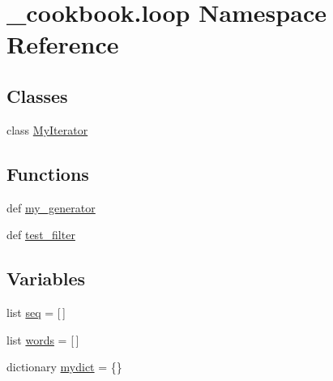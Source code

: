 \hypertarget{namespace__cookbook_1_1loop}{\section{\-\_\-cookbook.\-loop Namespace Reference}
\label{namespace__cookbook_1_1loop}
}
\subsection*{Classes}
\begin{DoxyCompactItemize}
\item 
class \hyperlink{class__cookbook_1_1loop_1_1MyIterator}{My\-Iterator}
\end{DoxyCompactItemize}
\subsection*{Functions}
\begin{DoxyCompactItemize}
\item 
def \hyperlink{namespace__cookbook_1_1loop_a9a2442115a97e67514ca641a1123a54b}{my\-\_\-generator}
\item 
def \hyperlink{namespace__cookbook_1_1loop_a0378ad6d1d792ff3aee7ea1bc6bd7e3b}{test\-\_\-filter}
\end{DoxyCompactItemize}
\subsection*{Variables}
\begin{DoxyCompactItemize}
\item 
list \hyperlink{namespace__cookbook_1_1loop_a5de56a796b0d1e61c000d4258c4174c4}{seq} = \mbox{[}$\,$\mbox{]}
\item 
list \hyperlink{namespace__cookbook_1_1loop_a65ecd74c88616db43b44e064e12bb30a}{words} = \mbox{[}$\,$\mbox{]}
\item 
dictionary \hyperlink{namespace__cookbook_1_1loop_a6e274a42a5573ac12fed6a6f9c318fe0}{mydict} = \{\}
\end{DoxyCompactItemize}


